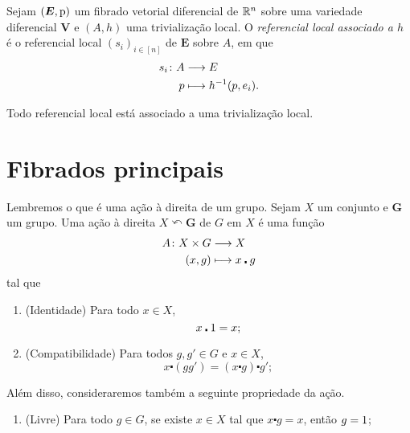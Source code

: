 \begin{definition}
Sejam $(\bm E,\mathrm{p})$ um fibrado vetorial diferencial de $\mathbb{R}^n$ sobre uma variedade diferencial $\bm V$ e $(A,h)$ uma trivialização local. O \emph{referencial local associado a $h$} é o referencial local $(s_i)_{i \in [n]}$ de $\bm E$ sobre $A$, em que
	\begin{align*}
	{s_i}\colon {A} &\longrightarrow {E} \\{p} &\longmapsto h^{-1} (p,e_i).
	\end{align*}
\end{definition}

\begin{exercise}
Todo referencial local está associado a uma trivialização local.
\end{exercise}






\section{Fibrados principais}

Lembremos o que é uma ação à direita de um grupo. Sejam $X$ um conjunto e $\bm G$ um grupo. Uma ação à direita $X \curvearrowleft \bm G$ de $G$ em $X$ é uma função
	\begin{align*}
	{A}\colon {X \times G} &\longrightarrow {X} \\{(x,g)} &\longmapsto x \centerdot g
	\end{align*}
tal que
	\begin{enumerate}
	\item (Identidade) Para todo $x \in X$,
		\begin{equation*}
		x \centerdot 1 = x;
		\end{equation*}

	\item (Compatibilidade) Para todos $g,g' \in G$ e $x \in X$,
		\begin{equation*}
		x \centerdot (gg') = (x \centerdot g) \centerdot g';
		\end{equation*}
	\end{enumerate}

Além disso, consideraremos também a seguinte propriedade da ação.
	\begin{enumerate}
%
	\item (Livre) Para todo $g \in G$, se existe $x \in X$ tal que $x \centerdot g = x$, então $g=1$;
%
	\end{enumerate}
%

